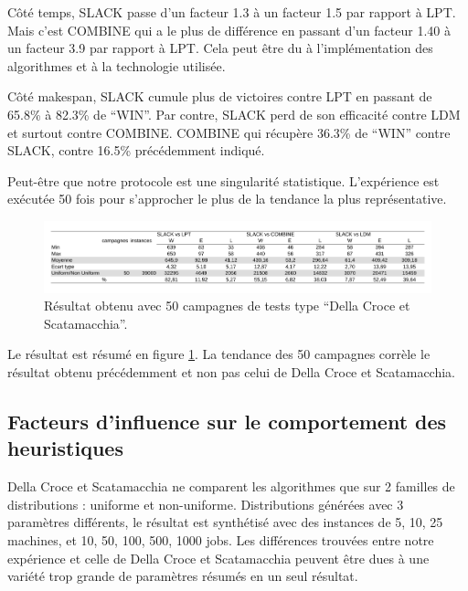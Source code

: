 \documentclass[a4paper,12pt]{report}
\theoremstyle{plain}				%
\theoremstyle{definition}				%
\begin{document}
Côté temps, SLACK passe d'un facteur 1.3 à un facteur 1.5 par rapport à LPT. 
Mais c'est COMBINE qui a le plus de différence en passant d'un facteur 1.40 
  à un facteur 3.9 par rapport à LPT. 
Cela peut être du à l'implémentation des algorithmes et à la technologie utilisée. 

Côté makespan, SLACK cumule plus de victoires contre LPT en passant de 65.8\% à 82.3\% de ``WIN''.
Par contre, SLACK perd de son efficacité contre LDM et surtout contre COMBINE. COMBINE qui récupère 36.3\% de ``WIN'' contre SLACK, contre 16.5\% précédemment indiqué.


Peut-être que notre protocole est une singularité statistique. L'expérience est exécutée 50 fois pour s'approcher le plus de la tendance la plus représentative.


\begin{figure}
{\centering
\includegraphics[width=\columnwidth]{4_Resultat_Reproduction50DCS.pdf}
\caption{Résultat obtenu avec 50 campagnes de tests type ``Della Croce et Scatamacchia''.}
\label{fig:resultatReproduction50DellaCroceScatamacchia}
\par}
\end{figure}

Le résultat est résumé en figure \ref{fig:resultatReproduction50DellaCroceScatamacchia}. 
La tendance des 50 campagnes corrèle le résultat obtenu précédemment et non pas 
  celui de Della Croce et Scatamacchia.

\subsection{Facteurs d'influence sur le comportement des heuristiques}
\label{ssec:resultatsFacteurInfluenceSurLeComportement}


Della Croce et Scatamacchia ne comparent les algorithmes que sur 2 familles de distributions : 
uniforme et non-uniforme. Distributions générées avec 3 paramètres différents, le résultat est synthétisé avec des instances de 5, 10, 25 machines, et 10, 50, 100, 500, 1000 jobs. 
Les différences trouvées entre notre expérience et celle de Della Croce et Scatamacchia peuvent 
être dues à une variété trop grande de paramètres résumés en un seul résultat.
\end{document}
